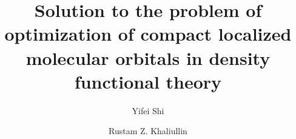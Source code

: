 \documentclass[aps,prl,twocolumn,reprint,amsmath,amssymb]{revtex4-1}
\begin{document}
\newcommand{\Ang}{\ensuremath{\mathring{\text{A}}}}
\newcommand{\ltwid}{\mathrel{\raise.3ex\hbox{$<$\kern-.75em\lower1ex\hbox{$\sim$}}}}
\newcommand{\gtwid}{\mathrel{\raise.3ex\hbox{$>$\kern-.75em\lower1ex\hbox{$\sim$}}}}
\newcommand{\ket}[1]{\ensuremath{\vert #1 \rangle}}
\newcommand{\bra}[1]{\ensuremath{\langle #1 \vert}}
\newcommand{\braket}[2]{\ensuremath{\langle #1 \vert #2 \rangle}} %
\newcommand{\ketbra}[2]{\ensuremath{\vert #1 \rangle \langle #2 \vert}} %
\newcommand{\op}[1]{\ensuremath{\hat{#1}}} %
\newcommand{\sill}{\psi}
\newcommand{\trace}{{\rm Tr}}
\newcommand{\ntilde}{\tilde{n}}
\newcommand{\stilde}{\tilde{s}}
\newcommand{\atilde}{\tilde{\alpha}}
\newcommand{\new}{\color{red}}
\newcommand{\old}{\color{black}}
\newcommand{\bea}{\begin{eqnarray}}
\newcommand{\eea}{\end{eqnarray}}
\newcommand{\br}{\ensuremath{\mathbf{r}}}
\def\nn{\nonumber\\}



\title{Solution to the problem of optimization of compact localized molecular orbitals in density functional theory}

\author{Yifei Shi}
\author{Rustam Z. Khaliullin}

\end{document}
